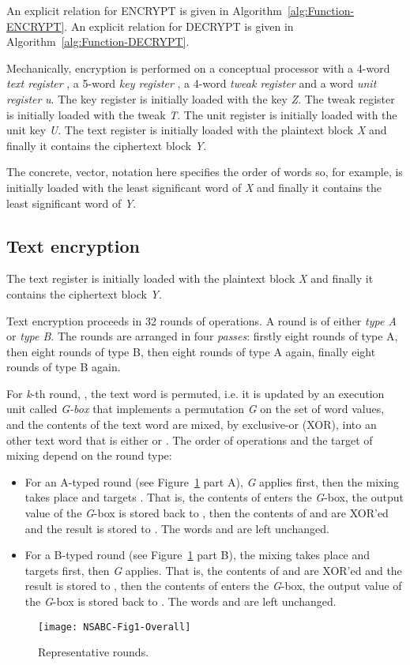 \documentclass[a4paper,oneside,english]{amsart}
\numberwithin{equation}{section}
\numberwithin{figure}{section}
\begin{document}
An explicit relation for ENCRYPT is given in Algorithm~\ref{alg:Function-ENCRYPT}.
An explicit relation for DECRYPT is given in Algorithm~\ref{alg:Function-DECRYPT}.

Mechanically, encryption is performed on a conceptual processor with
a 4-word \emph{text register} , a 5-word
\emph{key register} , a 4-word \emph{tweak
register}  and a word \emph{unit register}
\emph{u}. The key register is initially loaded with the key \emph{Z}.
The tweak register is initially loaded with the tweak \emph{T}. The
unit register is initially loaded with the unit key \emph{U}. The
text register is initially loaded with the plaintext block \emph{X}
and finally it contains the ciphertext block \emph{Y}. 

The concrete, vector, notation here specifies the order of words so,
for example,  is initially loaded with the least significant
word of \emph{X} and finally it contains the least significant word
of \emph{Y}.


\subsection{Text encryption }

The text register  is initially loaded
with the plaintext block \emph{X} and finally it contains the ciphertext
block \emph{Y}.

Text encryption proceeds in 32 rounds of operations. A round is of
either \emph{type A} or \emph{type B}. The rounds are arranged in
four \emph{passes}: firstly eight rounds of type A, then eight rounds
of type B, then eight rounds of type A again, finally eight rounds
of type B again.

For \emph{k}-th round, , the text word  is
permuted, i.e. it is updated by an execution unit called \emph{G-box}
that implements a permutation \emph{G} on the set of word values,
and the contents of the text word  are mixed, by exclusive-or
(XOR), into an other text word that is either  or .
The order of operations and the target of mixing depend on the round
type:
\begin{itemize}
\item For an A-typed round (see Figure~\ref{fig:Rounds} part A), \emph{G}
applies first, then the mixing takes place and targets . That
is, the contents of  enters the \emph{G}-box, the output value
of the \emph{G}-box is stored back to , then the contents
of  and  are XOR'ed and the result is stored to .
The words  and  are left unchanged.
\item For a B-typed round (see Figure~\ref{fig:Rounds} part B), the mixing
takes place and targets  first, then \emph{G} applies. That
is, the contents of  and  are XOR'ed and the result
is stored to , then the contents of  enters the \emph{G}-box,
the output value of the \emph{G}-box is stored back to . The
words  and  are left unchanged.
\end{itemize}
\begin{figure}
\texttt{[image: NSABC-Fig1-Overall]}

\caption{\label{fig:Rounds} Representative rounds.}
\end{figure}
\end{document}
